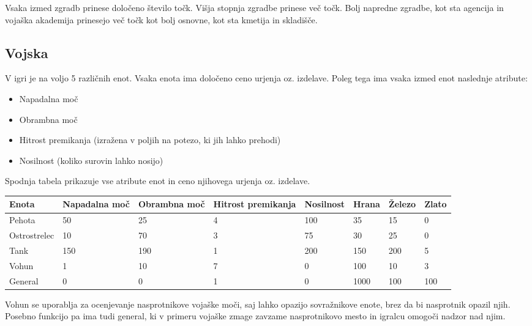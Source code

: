 \documentclass[a4paper, 16pt]{article}
\begin{document}
Vsaka izmed zgradb prinese določeno število točk. Višja stopnja zgradbe prinese več točk. Bolj napredne zgradbe, kot sta agencija in vojaška akademija prinesejo več točk kot bolj osnovne, kot sta kmetija in skladišče.

\subsection{Vojska}

V igri je na voljo 5 različnih enot. Vsaka enota ima določeno ceno urjenja oz. izdelave. Poleg tega ima vsaka izmed enot naslednje atribute:
\begin{itemize}
    \item Napadalna moč
    \item Obrambna moč
    \item Hitrost premikanja (izražena v poljih na potezo, ki jih lahko prehodi)
    \item Nosilnost (koliko surovin lahko nosijo)
\end{itemize}

Spodnja tabela prikazuje vse atribute enot in ceno njihovega urjenja oz. izdelave.

\begin{table}[]
    \begin{tabular}{l|llll|lll}
    Enota        & Napadalna moč & Obrambna moč & Hitrost premikanja & Nosilnost & Hrana & Železo & Zlato \\ \hline
    Pehota       & 50            & 25           & 4                  & 100       & 35    & 15     & 0     \\
    Ostrostrelec & 10            & 70           & 3                  & 75        & 30    & 25     & 0     \\
    Tank         & 150           & 190          & 1                  & 200       & 150   & 200    & 5     \\
    Vohun        & 1             & 10           & 7                  & 0         & 100   & 10     & 3     \\
    General      & 0             & 0            & 1                  & 0         & 1000  & 100    & 100  
    \end{tabular}
\end{table}

Vohun se uporablja za ocenjevanje nasprotnikove vojaške moči, saj lahko opazijo sovražnikove enote, brez da bi nasprotnik opazil njih.
Posebno funkcijo pa ima tudi general, ki v primeru vojaške zmage zavzame nasprotnikovo mesto in igralcu omogoči nadzor nad njim.
\end{document}
